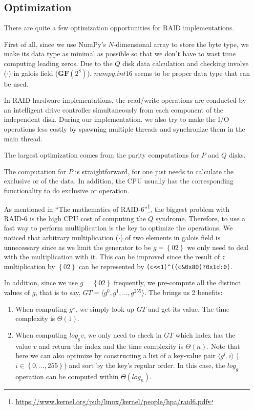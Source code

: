 \subsection{Optimization}

There are quite a few optimization opportunities for RAID implementations.

First of all, since we use \textsf{NumPy}'s $N$-dimensional array to store the byte type, we make its data type as minimal as possible so that we don't have to wast time computing leading zeros. Due to the $Q$ disk data calculation and checking involve ($\cdot$) in galois field ($\mathbf{GF}(2^8)$), $numpy.int16$ seems to be proper data type that can be used.

In RAID hardware implementations, the read/write operations are conducted by an intelligent drive controller simultaneously from each component of the independent disk. During our implementation, we also try to make the I/O operations less costly by spawning multiple threads and synchronize them in the main thread.

The largest optimization comes from the parity computations for $P$ and $Q$ disks.

The computation for $P$ is straightforward, for one just needs to calculate the exclusive or of the data. In addition, the CPU usually has the corresponding functionality to do exclusive or operation.

As mentioned in ``The mathematics of RAID-6''\footnote{\url{https://www.kernel.org/pub/linux/kernel/people/hpa/raid6.pdf}}, the biggest problem with RAID-6 is the high CPU cost of computing the $Q$ syndrome. Therefore, to use a fast way to perform multiplication is the key to optimize the operations. We noticed that arbitrary multiplication ($\cdot$) of two elements in galois field is unnecessary since as we limit the generator to be $g=\left\{02\right\}$ we only need to deal with the multiplication with it. This can be improved since the result of \verb|c| multiplication by $\left\{02\right\}$ can be represented by \verb|(c<<1)^((c&0x80)?0x1d:0)|.

In addition, since we use $g=\left\{02\right\}$ frequently, we pre-compute all the distinct values of $g$, that is to say, $GT=\langle g^0, g^1, \ldots, g^{255}\rangle$. The brings us 2 benefits:

\begin{enumerate}
	\item When computing $g^{x}$, we simply look up $GT$ and get its value. The time complexity is $\Theta(1)$.
	\item When computing $log_{g}v$, we only need to check in $GT$ which index has the value $v$ and return the index and the time complexity is $\Theta(n)$. Note that here we can also optimize by constructing a list of a key-value pair $\langle g^{i}, i\rangle$ ($i\in\left\{0,\ldots,255\right\}$) and sort by the key's regular order. In this case, the $log_{g}$ operation can be computed within $\Theta(log_{n})$.
\end{enumerate}


